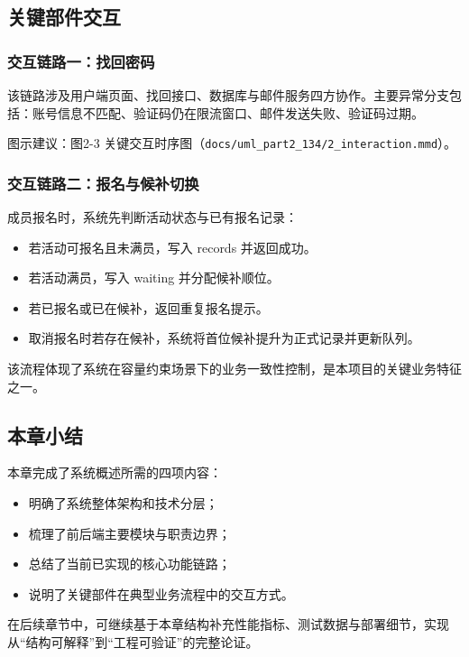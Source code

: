 \subsection{关键部件交互}

\subsubsection{交互链路一：找回密码}

该链路涉及用户端页面、找回接口、数据库与邮件服务四方协作。主要异常分支包括：账号信息不匹配、验证码仍在限流窗口、邮件发送失败、验证码过期。

图示建议：图2-3 关键交互时序图（\texttt{docs/uml\_part2\_134/2\_interaction.mmd}）。

\subsubsection{交互链路二：报名与候补切换}

成员报名时，系统先判断活动状态与已有报名记录：
\begin{itemize}
  \item 若活动可报名且未满员，写入 records 并返回成功。
  \item 若活动满员，写入 waiting 并分配候补顺位。
  \item 若已报名或已在候补，返回重复报名提示。
  \item 取消报名时若存在候补，系统将首位候补提升为正式记录并更新队列。
\end{itemize}

该流程体现了系统在容量约束场景下的业务一致性控制，是本项目的关键业务特征之一。

\subsection{本章小结}

本章完成了系统概述所需的四项内容：
\begin{itemize}
  \item 明确了系统整体架构和技术分层；
  \item 梳理了前后端主要模块与职责边界；
  \item 总结了当前已实现的核心功能链路；
  \item 说明了关键部件在典型业务流程中的交互方式。
\end{itemize}

在后续章节中，可继续基于本章结构补充性能指标、测试数据与部署细节，实现从“结构可解释”到“工程可验证”的完整论证。